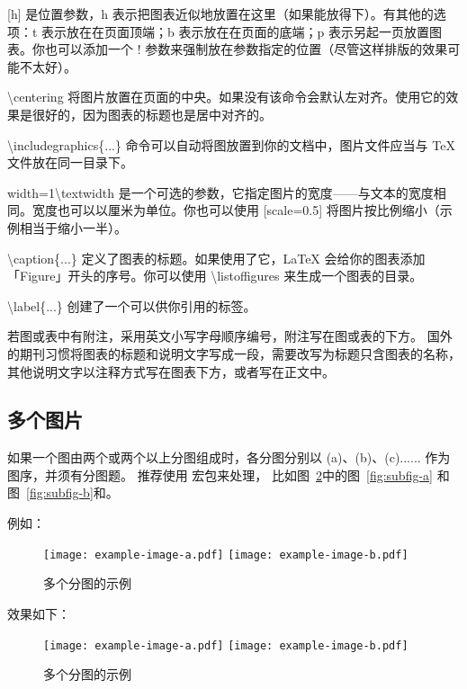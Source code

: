 [h] 是位置参数，h 表示把图表近似地放置在这里（如果能放得下）。有其他的选项：t 表示放在在页面顶端；b 表示放在在页面的底端；p 表示另起一页放置图表。你也可以添加一个 ! 参数来强制放在参数指定的位置（尽管这样排版的效果可能不太好）。

\textbackslash centering 将图片放置在页面的中央。如果没有该命令会默认左对齐。使用它的效果是很好的，因为图表的标题也是居中对齐的。

\textbackslash includegraphics\{...\} 命令可以自动将图放置到你的文档中，图片文件应当与 TeX 文件放在同一目录下。

width=1\textbackslash textwidth 是一个可选的参数，它指定图片的宽度——与文本的宽度相同。宽度也可以以厘米为单位。你也可以使用 [scale=0.5] 将图片按比例缩小（示例相当于缩小一半）。

\textbackslash caption\{...\} 定义了图表的标题。如果使用了它，LaTeX 会给你的图表添加「Figure」开头的序号。你可以使用 \textbackslash listoffigures 来生成一个图表的目录。

\textbackslash label\{...\} 创建了一个可以供你引用的标签。

若图或表中有附注，采用英文小写字母顺序编号，附注写在图或表的下方。
国外的期刊习惯将图表的标题和说明文字写成一段，需要改写为标题只含图表的名称，其他说明文字以注释方式写在图表下方，或者写在正文中。

\subsection{多个图片}

如果一个图由两个或两个以上分图组成时，各分图分别以 (a)、(b)、(c)...... 作为图序，并须有分图题。
推荐使用  宏包来处理， 比如图~\ref{fig:multi-image}中的图~\ref{fig:subfig-a} 和图~\ref{fig:subfig-b}和。

例如：

\begin{python}
\begin{figure}
	\centering
	{\texttt{[image: example-image-a.pdf]}}
	{\texttt{[image: example-image-b.pdf]}}
	\caption{多个分图的示例}
	\label{fig:multi-image}
\end{figure}
\end{python}

效果如下：

\begin{figure}
	\centering
	{\texttt{[image: example-image-a.pdf]}}
	{\texttt{[image: example-image-b.pdf]}}
	\caption{多个分图的示例}
	\label{fig:multi-image}
\end{figure}

